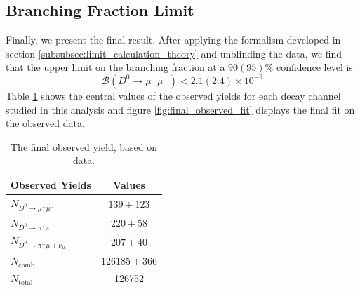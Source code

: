 \subsection{Branching Fraction Limit}
\label{subsec:final_result}

Finally, we present the final result. After applying the formalism developed in section \ref{subsubsec:limit_calculation_theory} and unblinding the data, we find that the upper limit on the branching fraction at a $90(95)\%$ confidence level is
\begin{equation}
    \mathcal{B}(D^0 \to \mu^+ \mu^-) < 2.1(2.4) \times 10^{-9} 
\end{equation}
Table \ref{tab:final_observed_yeild} shows the central values of the observed yields for each decay channel studied in this analysis and figure \ref{fig:final_observed_fit} displays the final fit on the observed data.

\begin{table}[h!]
    \centering
    \begin{tabular}{|l|c|}
    \hline
    \textbf{Observed Yields} & \textbf{Values} \\
    \hline
    $N_{D^0 \rightarrow \mu^+\mu^-}$ & $139 \pm 123$ \\
    $N_{D^0 \rightarrow \pi^+\pi^-}$ & $220 \pm 58$ \\
    $N_{D^0 \rightarrow \pi^-\mu+\nu_\mu}$ & $207 \pm 40$ \\
    $N_{\text{comb}}$ & $126185 \pm 366$ \\
    $N_{\text{total}}$ & 126752 \\
    \hline
\end{tabular}
\caption{The final observed yield, based on data.}
\label{tab:final_observed_yeild}
\end{table}

